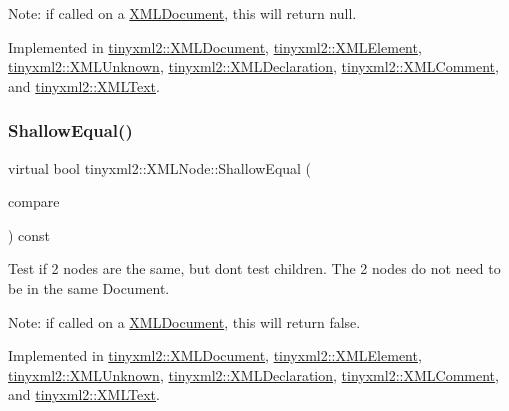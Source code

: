 Note\+: if called on a \mbox{\hyperlink{classtinyxml2_1_1_x_m_l_document}{X\+M\+L\+Document}}, this will return null. 

Implemented in \mbox{\hyperlink{classtinyxml2_1_1_x_m_l_document_aa37cc1709d7e1e988bc17dcfb24a69b8}{tinyxml2\+::\+X\+M\+L\+Document}}, \mbox{\hyperlink{classtinyxml2_1_1_x_m_l_element_aafa2807a45b28fe096b29d76e6a13b7c}{tinyxml2\+::\+X\+M\+L\+Element}}, \mbox{\hyperlink{classtinyxml2_1_1_x_m_l_unknown_ab73b48b819aa4b2ef3815dc2d7d20d5f}{tinyxml2\+::\+X\+M\+L\+Unknown}}, \mbox{\hyperlink{classtinyxml2_1_1_x_m_l_declaration_ad9d60e6d2df75c13eb6bf7319985b747}{tinyxml2\+::\+X\+M\+L\+Declaration}}, \mbox{\hyperlink{classtinyxml2_1_1_x_m_l_comment_adf5b5c0319351dcc339df098d11e8fb2}{tinyxml2\+::\+X\+M\+L\+Comment}}, and \mbox{\hyperlink{classtinyxml2_1_1_x_m_l_text_a86d265c93152726c8c6831e9594840e6}{tinyxml2\+::\+X\+M\+L\+Text}}.

\mbox{\label{classtinyxml2_1_1_x_m_l_node_a7ce18b751c3ea09eac292dca264f9226}} 
\subsubsection{\texorpdfstring{Shallow\+Equal()}{ShallowEqual()}}
{\footnotesize\ttfamily virtual bool tinyxml2\+::\+X\+M\+L\+Node\+::\+Shallow\+Equal (\begin{DoxyParamCaption}\item[{const \mbox{\hyperlink{classtinyxml2_1_1_x_m_l_node}{X\+M\+L\+Node}} $\ast$}]{compare }\end{DoxyParamCaption}) const\hspace{0.3cm}{\ttfamily [pure virtual]}}

Test if 2 nodes are the same, but don\textquotesingle{}t test children. The 2 nodes do not need to be in the same Document.

Note\+: if called on a \mbox{\hyperlink{classtinyxml2_1_1_x_m_l_document}{X\+M\+L\+Document}}, this will return false. 

Implemented in \mbox{\hyperlink{classtinyxml2_1_1_x_m_l_document_a6fe5ef18699091844fcf64b56ffa5bf9}{tinyxml2\+::\+X\+M\+L\+Document}}, \mbox{\hyperlink{classtinyxml2_1_1_x_m_l_element_a61ffd7bf918a9db4aa6203d855ac5ec2}{tinyxml2\+::\+X\+M\+L\+Element}}, \mbox{\hyperlink{classtinyxml2_1_1_x_m_l_unknown_ac46767cd721d666e690a6231dfb618d1}{tinyxml2\+::\+X\+M\+L\+Unknown}}, \mbox{\hyperlink{classtinyxml2_1_1_x_m_l_declaration_ae8b4d3a399857029f36c322b0801b69c}{tinyxml2\+::\+X\+M\+L\+Declaration}}, \mbox{\hyperlink{classtinyxml2_1_1_x_m_l_comment_a965d880a99d58dd915caa88dc37a9b51}{tinyxml2\+::\+X\+M\+L\+Comment}}, and \mbox{\hyperlink{classtinyxml2_1_1_x_m_l_text_a99d8bce4dc01df889126e047f358cdfc}{tinyxml2\+::\+X\+M\+L\+Text}}.

